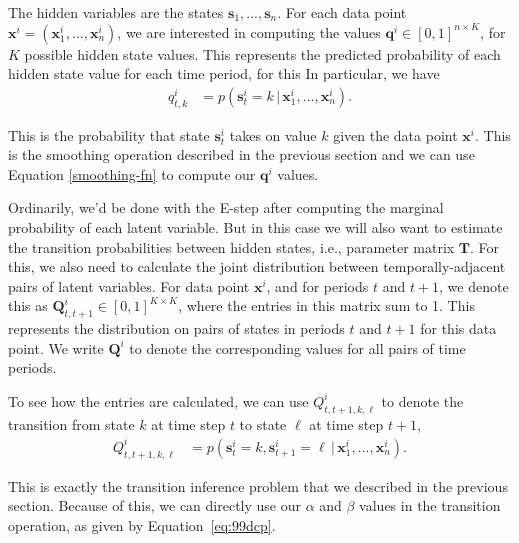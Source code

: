 The hidden variables are the states $\textbf{s}_1, ..., \textbf{s}_n$. For each data point $\textbf{x}^i = (\textbf{x}_1^i, ..., \textbf{x}_n^i)$, we are interested in computing the values $\textbf{q}^i \in [0,1]^{n \times K}$, for $K$ possible hidden state values. This represents the predicted probability of each hidden state value for each time period, for this
%
In particular,  we have 
\begin{align}
	q_{t, k}^i &= p(\textbf{s}_{t}^i = k \, |\,  \textbf{x}_1^i, ..., \textbf{x}_n^i).
\end{align}


This is the probability that state $\textbf{s}_{t}^i$ takes on value $k$ given the data point $\textbf{x}^i$.  This is the smoothing operation described in the previous section and we can use Equation \ref{smoothing-fn} to compute our $\textbf{q}^i$ values.

Ordinarily, we'd be done with the E-step after computing the marginal probability of each latent variable. But in this case we will also want to estimate the transition probabilities between  hidden states, i.e.,
parameter matrix $\textbf{T}$.
%
For this, we also need to calculate the joint distribution between temporally-adjacent pairs of latent variables. For data point $\textbf{x}^i$, and for periods $t$ and $t+1$, we denote this as $\textbf{Q}_{t, t+1}^i \in [0,1]^{K \times K}$, where the entries in this matrix sum to 1.
This represents the distribution on pairs of states in periods $t$ and $t+1$ for this data point. 
%
We write $\textbf{Q}^i$ to denote the corresponding values for all pairs of time periods.


To see how the entries are calculated, we can use $Q_{t, t+1, k, \ell}^i$ to denote the transition from state $k$ at time step $t$ to state $\ell$ at time step $t+1$,
%
\begin{align}
  Q_{t, t+1, k, \ell}^i %
	&= p(\textbf{s}_{t}^i = k, \textbf{s}_{t+1}^i = \ell\, |\, \textbf{x}_1^i, ..., \textbf{x}_n^i). 
\end{align}

This is exactly the transition inference problem that we described in the previous section.  Because of this, we can directly use our $\alpha$ and $\beta$ values in the transition operation, as given by Equation~\eqref{eq:99dcp}.

